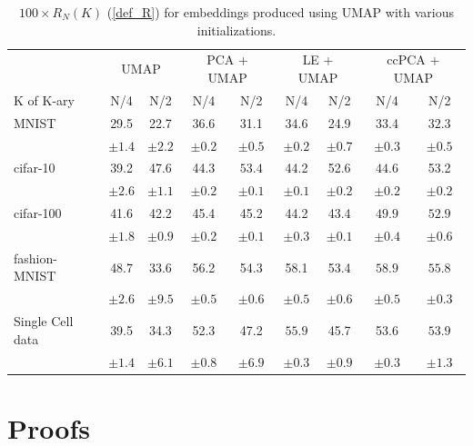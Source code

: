 \begin{table}[H]
\caption{$100 \times R_{N}(K)$ (\ref{def_R}) for embeddings produced using UMAP with various initializations.}
\begin{footnotesize}
\begin{center}
\begin{tabular}{lcccccccc}
\toprule
& \multicolumn{2}{c}{UMAP} & \multicolumn{2}{c}{PCA + UMAP} & \multicolumn{2}{c}{LE + UMAP} & \multicolumn{2}{c}{ccPCA + UMAP} \\
\cmidrule(lr){2-3}\cmidrule(lr){4-5}\cmidrule(lr){6-7}\cmidrule(lr){8-9}
K of K-ary & {N/4} & {N/2}  & {N/4} & {N/2} & {N/4} & {N/2} & {N/4} & {N/2} \\
\midrule
MNIST & 29.5 & 22.7 & $\bm{36.6}$ & 31.1 & 34.6 & 24.9 & 33.4 & $\bm{32.3}$ \\
& $\pm 1.4$ & $\pm 2.2$ & $\pm 0.2$ & $\pm 0.5$ & $\pm 0.2$ & $\pm 0.7$ & $\pm 0.3$ & $\pm 0.5$ 
\vspace{0.1cm}
\\
cifar-10 & 39.2 & 47.6 & 44.3 & $\bm{53.4}$ & 44.2 & 52.6 & $\bm{44.6}$ & 53.2\\
& $\pm 2.6$ & $\pm 1.1$ & $\pm 0.2$ & $\pm 0.1$ & $\pm 0.1$ & $\pm 0.2$ & $\pm 0.2$ & $\pm 0.2$ 
\vspace{0.1cm}
\\
cifar-100 & 41.6 & 42.2 & 45.4 & 45.2 & 44.2 & 43.4 & $\bm{49.9}$ & $\bm{52.9}$\\
& $\pm 1.8$ & $\pm 0.9$ & $\pm 0.2$ & $\pm 0.1$ & $\pm 0.3$ & $\pm 0.1$ & $\pm 0.4$ & $\pm 0.6$ 
\vspace{0.1cm}
\\
fashion-MNIST & 48.7 & 33.6 & 56.2 & 54.3 & 58.1 & 53.4 & $\bm{58.9}$ & $\bm{55.8}$ \\
& $\pm 2.6$ & $\pm 9.5$ & $\pm 0.5$ & $\pm 0.6$ & $\pm 0.5$ & $\pm 0.6$ & $\pm 0.5$ & $\pm 0.3$ 
\vspace{0.1cm}
\\
Single Cell data & 39.5 & 34.3 & 52.3 & 47.2 & $\bm{55.9}$ & 45.7 & 53.6 & $\bm{53.9}$\\
& $\pm 1.4$ & $\pm 6.1$ & $\pm 0.8$ & $\pm 6.9$ & $\pm 0.3$ & $\pm 0.9$ & $\pm 0.3$ & $\pm 1.3$ 
\\
\bottomrule
\end{tabular}
\end{center}
\end{footnotesize}
\label{UMAP_quantitative_results}
\end{table}

\section{Proofs}

